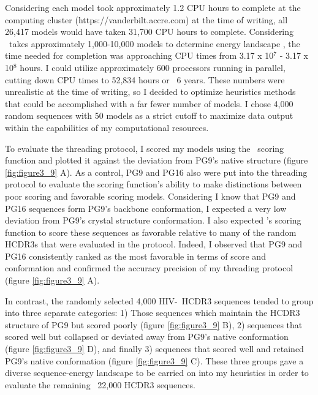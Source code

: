 Considering each model took approximately 1.2 CPU hours to complete at the computing cluster (https://vanderbilt.accre.com) at the time of writing, all 26,417 models would have taken 31,700 CPU hours to complete. Considering \rosetta~takes approximately 1,000-10,000 models to determine energy landscape \citep{Simons:1999wd,Bradley:2005bu,Bradley:2003db,Das:2007em,Raman:2009ht}, the time needed for completion was approaching CPU times from 3.17 x 10$^{7}$  - 3.17 x 10$^{8}$ hours. I could utilize approximately 600 processors running in parallel, cutting down CPU times to 52,834 hours or ~6 years. These numbers were unrealistic at the time of writing, so I decided to optimize heuristics methods that could be accomplished with a far fewer number of models. I chose 4,000 random sequences with 50 models as a strict cutoff to maximize data output within the capabilities of my computational resources.

To evaluate the threading protocol, I scored my models using the \rosetta~scoring function and plotted it against the deviation from PG9's native structure (figure \ref{fig:figure3_9} A). As a control, PG9 and PG16 also were put into the threading protocol to evaluate the scoring function's ability to make distinctions between poor scoring and favorable scoring models. Considering I know that PG9 and PG16 sequences form PG9's backbone conformation, I expected a very low deviation from PG9's crystal structure conformation. I also expected \rosetta's scoring function to score these sequences as favorable relative to many of the random HCDR3s that were evaluated in the protocol. Indeed, I observed that PG9 and PG16 consistently ranked as the most favorable in terms of score and conformation and confirmed the accuracy precision of my threading protocol (figure \ref{fig:figure3_9} A).

In contrast, the randomly selected 4,000 HIV-\naive~HCDR3 sequences tended to group into three separate categories: 1) Those sequences which maintain the HCDR3 structure of PG9 but scored poorly (figure \ref{fig:figure3_9} B), 2) sequences that scored well but collapsed or deviated away from PG9's native conformation (figure \ref{fig:figure3_9} D), and finally 3) sequences that scored well and retained PG9's native conformation (figure \ref{fig:figure3_9} C). These three groups gave a diverse sequence-energy landscape to be carried on into my heuristics in order to evaluate the remaining ~22,000 HCDR3 sequences.

